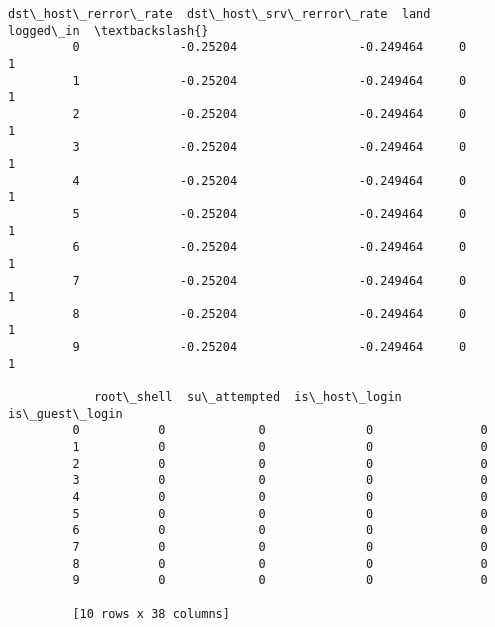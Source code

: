 \documentclass[11pt]{article}
\begin{document}
\begin{Verbatim}[commandchars=\\\{\}]
            dst\_host\_rerror\_rate  dst\_host\_srv\_rerror\_rate  land  logged\_in  \textbackslash{}
         0              -0.25204                 -0.249464     0          1   
         1              -0.25204                 -0.249464     0          1   
         2              -0.25204                 -0.249464     0          1   
         3              -0.25204                 -0.249464     0          1   
         4              -0.25204                 -0.249464     0          1   
         5              -0.25204                 -0.249464     0          1   
         6              -0.25204                 -0.249464     0          1   
         7              -0.25204                 -0.249464     0          1   
         8              -0.25204                 -0.249464     0          1   
         9              -0.25204                 -0.249464     0          1   
         
            root\_shell  su\_attempted  is\_host\_login  is\_guest\_login  
         0           0             0              0               0  
         1           0             0              0               0  
         2           0             0              0               0  
         3           0             0              0               0  
         4           0             0              0               0  
         5           0             0              0               0  
         6           0             0              0               0  
         7           0             0              0               0  
         8           0             0              0               0  
         9           0             0              0               0  
         
         [10 rows x 38 columns]
\end{Verbatim}
            
\end{document}
